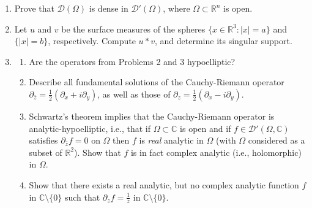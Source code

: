 \documentclass[11pt]{amsart}
\newcommand{\R}{\mathbb{R}}
\newcommand{\C}{\mathbb{C}}
\newcommand{\tstD}{\mathscr{D}}
\newcommand{\singsupp}{\mathrm{singsupp}}
\begin{document}
\begin{enumerate}[1.]
$$$$
Show that
$$
1*(\delta'*\vartheta) \neq (1*\delta')*\vartheta,
$$
where $1$ is the function identically $1$ in $\R$, and $\vartheta$ is the Heaviside step function.
\item
Prove that $\tstD(\Omega)$ is dense in $\tstD'(\Omega)$, where $\Omega\subset\R^n$ is open.
\item
Let $u$ and $v$ be the surface measures of the spheres $\{x\in\R^3:|x|=a\}$ and $\{|x|=b\}$, respectively.
Compute $u*v$, and determine its singular support. %
\item
\begin{enumerate}[{\em a)}]
\item
Are the operators from Problems 2 and 3 hypoelliptic?
\item
Describe all fundamental solutions of the Cauchy-Riemann operator $\partial_{\bar z} = \frac12(\partial_x+i\partial_y)$, 
as well as those of $\partial_z = \frac12(\partial_x-i\partial_y)$.
\item
Schwartz's theorem implies that the Cauchy-Riemann operator is analytic-hypoelliptic,
i.e., that if $\Omega\subset\C$ is open and if $f\in\tstD'(\Omega,\C)$ satisfies $\partial_{\bar z}f=0$ on $\Omega$ then $f$ is {\em real} analytic in $\Omega$
(with $\Omega$ considered as a subset of $\R^2$).
Show that $f$ is in fact complex analytic (i.e., holomorphic) in $\Omega$.
\item
Show that there exists a real analytic, but no complex analytic function $f$ in $\C\setminus\{0\}$ such that 
$\partial_zf=\frac1z$ in $\C\setminus\{0\}$.
\end{enumerate}
\end{enumerate}
\end{document}
